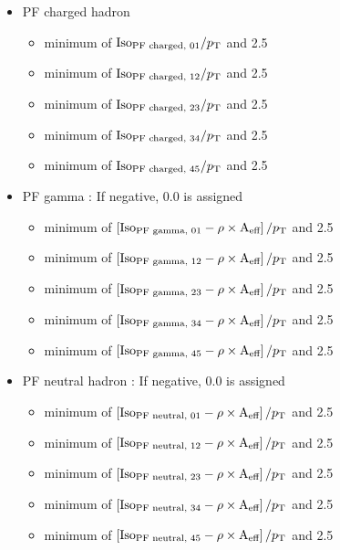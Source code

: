 \begin{itemize}
\item PF charged hadron
	\begin{itemize}
    \item minimum of $\textrm{Iso}_\textrm{PF charged, 01}/p_\mathrm{T}$ and 2.5	
    \item minimum of $\textrm{Iso}_\textrm{PF charged, 12}/p_\mathrm{T}$ and 2.5	
    \item minimum of $\textrm{Iso}_\textrm{PF charged, 23}/p_\mathrm{T}$ and 2.5	
    \item minimum of $\textrm{Iso}_\textrm{PF charged, 34}/p_\mathrm{T}$ and 2.5	
    \item minimum of $\textrm{Iso}_\textrm{PF charged, 45}/p_\mathrm{T}$ and 2.5	
	\end{itemize}
\item PF gamma : If negative, 0.0 is assigned
	\begin{itemize}
    \item minimum of $\left[\textrm{Iso}_\textrm{PF gamma, 01} - \rho \times \textrm{A}_{\textrm{eff}}\right]/p_\mathrm{T}$ and 2.5 
    \item minimum of $\left[\textrm{Iso}_\textrm{PF gamma, 12} - \rho \times \textrm{A}_{\textrm{eff}}\right]/p_\mathrm{T}$ and 2.5 
    \item minimum of $\left[\textrm{Iso}_\textrm{PF gamma, 23} - \rho \times \textrm{A}_{\textrm{eff}}\right]/p_\mathrm{T}$ and 2.5 
    \item minimum of $\left[\textrm{Iso}_\textrm{PF gamma, 34} - \rho \times \textrm{A}_{\textrm{eff}}\right]/p_\mathrm{T}$ and 2.5 
    \item minimum of $\left[\textrm{Iso}_\textrm{PF gamma, 45} - \rho \times \textrm{A}_{\textrm{eff}}\right]/p_\mathrm{T}$ and 2.5 
	\end{itemize}
\item PF neutral hadron : If negative, 0.0 is assigned
	\begin{itemize}
    \item minimum of $\left[\textrm{Iso}_\textrm{PF neutral, 01} - \rho \times \textrm{A}_{\textrm{eff}}\right]/p_\mathrm{T}$ and 2.5 
    \item minimum of $\left[\textrm{Iso}_\textrm{PF neutral, 12} - \rho \times \textrm{A}_{\textrm{eff}}\right]/p_\mathrm{T}$ and 2.5 
    \item minimum of $\left[\textrm{Iso}_\textrm{PF neutral, 23} - \rho \times \textrm{A}_{\textrm{eff}}\right]/p_\mathrm{T}$ and 2.5 
    \item minimum of $\left[\textrm{Iso}_\textrm{PF neutral, 34} - \rho \times \textrm{A}_{\textrm{eff}}\right]/p_\mathrm{T}$ and 2.5 
    \item minimum of $\left[\textrm{Iso}_\textrm{PF neutral, 45} - \rho \times \textrm{A}_{\textrm{eff}}\right]/p_\mathrm{T}$ and 2.5 
	\end{itemize}
\end{itemize}
